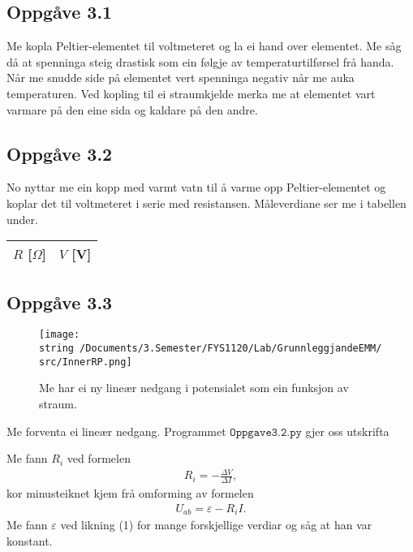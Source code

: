 \documentclass[11pt, a4paper]{article}
\begin{document}
  \subsection*{Oppgåve 3.1}
    Me kopla Peltier-elementet til voltmeteret og la ei hand over elementet. Me såg då at spenninga steig drastisk som ein følgje av temperaturtilførsel frå handa. Når me snudde 
    side på elementet vert spenninga negativ når me auka temperaturen. Ved kopling til ei straumkjelde merka me at elementet vart varmare på den eine sida og kaldare på den andre.


  \subsection*{Oppgåve 3.2}
    No nyttar me ein kopp med varmt vatn til å varme opp Peltier-elementet og koplar det til voltmeteret i serie med resistansen.
    Måleverdiane ser me i tabellen under.
    \begin{center}
      \begin{tabular}{|l|l|}
        \hline
        $R$ [$\Omega$] & $V$ [V] \\
        \hline
        
        \hline
      \end{tabular}
    \end{center}



  \subsection*{Oppgåve 3.3}
    \begin{figure}[H]
      \centering
      \texttt{[image: \\string~/Documents/3.Semester/FYS1120/Lab/GrunnleggjandeEMM/src/InnerRP.png]}
      \caption{Me har ei ny lineær nedgang i potensialet som ein funksjon av straum.}
    \end{figure}

    Me forventa ei lineær nedgang. Programmet $\texttt{Oppgave3.2.py}$ gjer oss utskrifta
    \begin{center}
      
    \end{center}
    Me fann $R_{i}$ ved formelen
    \begin{align*}
      R_i = -\frac{\Delta V}{\Delta I},
    \end{align*}
    kor minusteiknet kjem frå omforming av formelen
    \begin{align}
      U_{ab} = \varepsilon - R_iI.
    \end{align}
    Me fann $\varepsilon$ ved likning (1) for mange forskjellige verdiar og såg at han var konstant.
\end{document}
